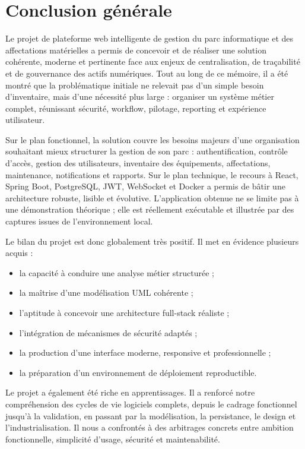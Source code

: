﻿\documentclass[12pt,a4paper,oneside]{report}
\begin{document}


\chapter*{Conclusion générale}

Le projet de plateforme web intelligente de gestion du parc informatique et des affectations matérielles a permis de concevoir et de réaliser une solution cohérente, moderne et pertinente face aux enjeux de centralisation, de traçabilité et de gouvernance des actifs numériques. Tout au long de ce mémoire, il a été montré que la problématique initiale ne relevait pas d'un simple besoin d'inventaire, mais d'une nécessité plus large : organiser un système métier complet, réunissant sécurité, workflow, pilotage, reporting et expérience utilisateur.

Sur le plan fonctionnel, la solution couvre les besoins majeurs d'une organisation souhaitant mieux structurer la gestion de son parc : authentification, contrôle d'accès, gestion des utilisateurs, inventaire des équipements, affectations, maintenance, notifications et rapports. Sur le plan technique, le recours à React, Spring Boot, PostgreSQL, JWT, WebSocket et Docker a permis de bâtir une architecture robuste, lisible et évolutive. L'application obtenue ne se limite pas à une démonstration théorique ; elle est réellement exécutable et illustrée par des captures issues de l'environnement local.

Le bilan du projet est donc globalement très positif. Il met en évidence plusieurs acquis :
\begin{itemize}
  \item la capacité à conduire une analyse métier structurée ;
  \item la maîtrise d'une modélisation UML cohérente ;
  \item l'aptitude à concevoir une architecture full-stack réaliste ;
  \item l'intégration de mécanismes de sécurité adaptés ;
  \item la production d'une interface moderne, responsive et professionnelle ;
  \item la préparation d'un environnement de déploiement reproductible.
\end{itemize}

Le projet a également été riche en apprentissages. Il a renforcé notre compréhension des cycles de vie logiciels complets, depuis le cadrage fonctionnel jusqu'à la validation, en passant par la modélisation, la persistance, le design et l'industrialisation. Il nous a confrontés à des arbitrages concrets entre ambition fonctionnelle, simplicité d'usage, sécurité et maintenabilité.
\end{document}
